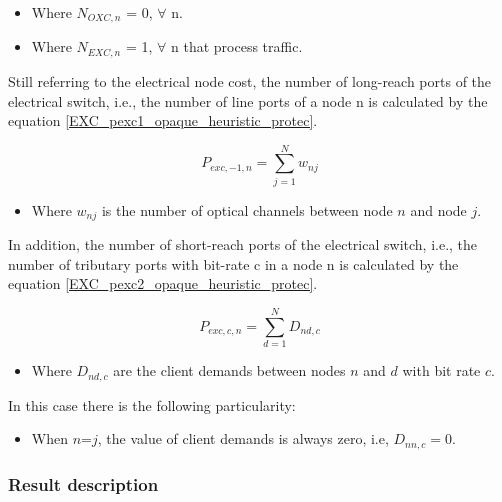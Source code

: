 \begin{itemize}
  \item Where $N_{OXC,n}$ = 0, \quad $\forall$ n.
  \item Where $N_{EXC,n}$ = 1, \quad $\forall$ n that process traffic.
\end{itemize}

Still referring to the electrical node cost, the number of long-reach ports of the electrical switch, i.e., the number of line ports of a node n is calculated by the equation \ref{EXC_pexc1_opaque_heuristic_protec}.

\begin{equation}
P_{exc,-1,n} = \sum_{j=1}^{N} w_{nj}
\label{EXC_pexc1_opaque_heuristic_protec}
\end{equation}

\begin{itemize}
\item Where {$w_{nj}$ is the number of optical channels between node $n$ and node $j$}.
\end{itemize}

\newpage
\vspace{11pt}
In addition, the number of short-reach ports of the electrical switch, i.e., the number of tributary ports with bit-rate c in a node n is calculated by the equation \ref{EXC_pexc2_opaque_heuristic_protec}.

\begin{equation}
P_{exc,c,n} = \sum_{d=1}^{N} D_{nd,c}
\label{EXC_pexc2_opaque_heuristic_protec}
\end{equation}

\begin{itemize}
  \item Where {$D_{nd,c}$ are the client demands between nodes $n$ and $d$ with bit rate $c$}.
\end{itemize}

\vspace{11pt}
In this case there is the following particularity:

\begin{itemize}
  \item When $n$=$j$, the value of client demands is always zero, i.e, $D_{nn,c}=0$.
\end{itemize}

\subsubsection{Result description}


